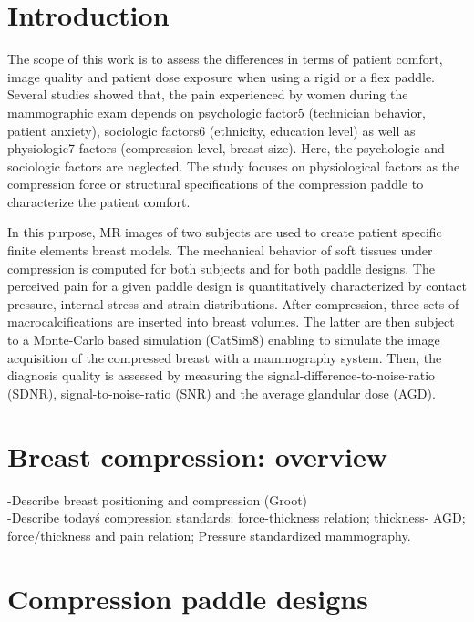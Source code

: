 
\section{Introduction }\label{compression:introduction}
The scope of this work is to assess the differences in terms of patient comfort, image quality and patient dose exposure when using a rigid or a flex paddle. Several studies showed that, the pain experienced by women during the mammographic exam depends on psychologic factor5 (technician behavior, patient anxiety), sociologic factors6 (ethnicity, education level) as well as physiologic7 factors (compression level,  breast size). Here, the psychologic and sociologic factors are neglected. The study focuses on physiological factors as the compression force or structural specifications of the compression paddle to characterize the patient comfort. 

In this purpose, MR images of two subjects are used to create patient specific finite elements breast models. The mechanical behavior of soft tissues under compression is computed for both subjects and for both paddle designs. The perceived pain for a given paddle design is quantitatively characterized by contact pressure, internal stress and strain distributions. After compression, three sets of macrocalcifications are inserted into breast volumes. The latter are then subject to a Monte-Carlo based simulation (CatSim8) enabling to simulate the image acquisition of the compressed breast with a mammography system. Then, the diagnosis quality is assessed by measuring the signal-difference-to-noise-ratio (SDNR), signal-to-noise-ratio (SNR) and the average glandular dose (AGD).  
\section{Breast compression: overview }\label{section:compression:stateoftheart}

{\color{darkblue}
-Describe breast positioning and compression (Groot) \\
-Describe today\'s  compression standards: force-thickness relation; thickness- AGD; force/thickness and pain relation;  Pressure standardized mammography.}

\section{Compression paddle designs} \label{section:compressionpaddlesdesign}



